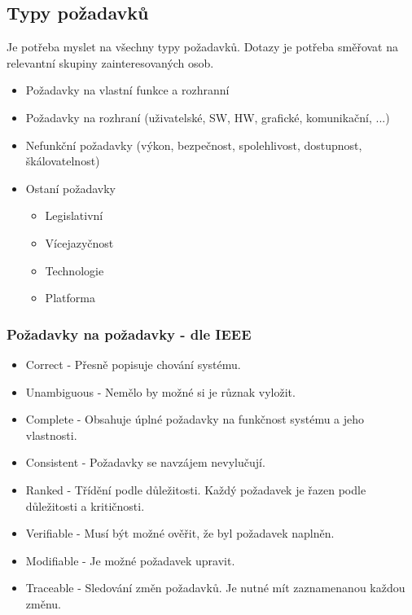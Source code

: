   \subsection{Typy požadavků}
    Je potřeba myslet na všechny typy požadavků.
    Dotazy je potřeba směřovat na relevantní skupiny zainteresovaných osob.
    \begin{itemize}
      \item Požadavky na vlastní funkce a rozhranní
      \item Požadavky na rozhraní (uživatelské, SW, HW, grafické, komunikační, ...)
      \item Nefunkční požadavky (výkon, bezpečnost, spolehlivost, dostupnost, škálovatelnost)
      \item Ostaní požadavky
        \begin{itemize}
          \item Legislativní
          \item Vícejazyčnost
          \item Technologie
          \item Platforma
        \end{itemize}
    \end{itemize}

    \subsubsection{Požadavky na požadavky - dle IEEE}
      \begin{itemize}
        \item Correct - Přesně popisuje chování systému.
        \item Unambiguous - Nemělo by možné si je různak vyložit.
        \item Complete - Obsahuje úplné požadavky na funkčnost systému a jeho vlastnosti.
        \item Consistent - Požadavky se navzájem nevylučují.
        \item Ranked - Třídění podle důležitosti. Každý požadavek je řazen podle důležitosti a kritičnosti.
        \item Verifiable - Musí být možné ověřit, že byl požadavek naplněn.
        \item Modifiable - Je možné požadavek upravit.
        \item Traceable - Sledování změn požadavků. Je nutné mít zaznamenanou každou změnu.
      \end{itemize}
